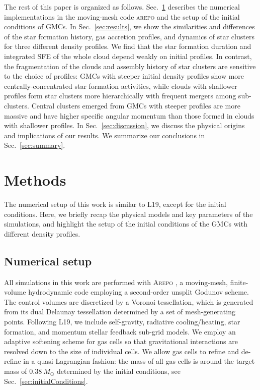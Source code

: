\documentclass[fleqn,usenatbib]{mnras}
\begin{document}
The rest of this paper is organized as follows.
Sec.~\ref{sec:methods} describes the numerical implementations in the moving-mesh code \textsc{arepo} and the setup of the initial conditions of GMCs.
In Sec.~\ref{sec:results}, we show the similarities and differences of the star formation history, gas accretion profiles, and dynamics of star clusters for three different density profiles. We find that the star formation duration and integrated SFE of the whole cloud depend weakly on initial profiles. In contrast, the fragmentation of the clouds and assembly history of star clusters are sensitive to the choice of profiles: GMCs with steeper initial density profiles show more centrally-concentrated star formation activities, while clouds with shallower profiles form star clusters more hierarchically with frequent mergers among sub-clusters. Central clusters emerged from GMCs with steeper profiles are more massive and have higher specific angular momentum than those formed in clouds with shallower profiles.
In Sec.~\ref{sec:discussion}, we discuss the physical origins and implications of our results. We summarize our conclusions in Sec.~\ref{sec:summary}.

\section{Methods}
\label{sec:methods}
The numerical setup of this work is similar to L19, except for the initial conditions.
Here, we briefly recap the physical models and key parameters of the simulations, and highlight the setup of the initial conditions of the GMCs with different density profiles.

\subsection{Numerical setup}
\label{sec:numericalSetup}

All simulations in this work are performed with \textsc{Arepo} \citep{springel_e_2010}, a moving-mesh, finite-volume hydrodynamic code employing a second-order unsplit Godunov scheme.
The control volumes are discretized by a Voronoi tessellation, which is generated from its dual Delaunay tessellation determined by a set of mesh-generating points.
Following L19, we include self-gravity, radiative cooling/heating, star formation, and momentum stellar feedback sub-grid models.
We employ an adaptive softening scheme for gas cells so that gravitational interactions are resolved down to the size of individual cells.
We allow gas cells to refine and de-refine in a quasi-Lagrangian fashion: the mass of all gas cells is around the target mass of $0.38\ M_\odot$ determined by the initial conditions, see Sec.~\ref{sec:initialConditions}.
\end{document}
